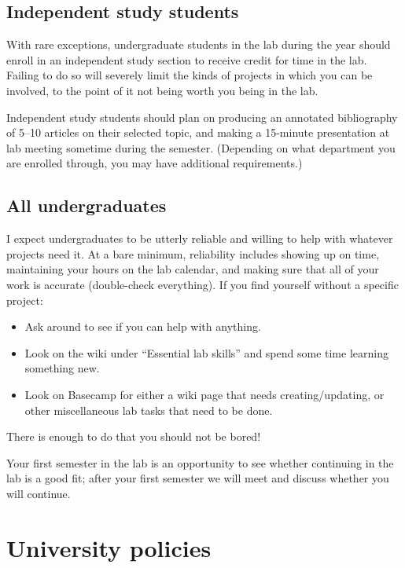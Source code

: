 \documentclass[letterpaper,12pt,oneside]{memoir}
\begin{document}
\subsection{Independent study students}
With rare exceptions, undergraduate students in the lab during the year should enroll in an independent study section to receive credit for time in the lab. Failing to do so will severely limit the kinds of projects in which you can be involved, to the point of it not being worth you being in the lab.

Independent study students should plan on producing an annotated bibliography of 5--10 articles on their selected topic, and making a 15-minute presentation at lab meeting sometime during the semester. (Depending on what department you are enrolled through, you may have additional requirements.)



\subsection{All undergraduates}

I expect undergraduates to be utterly reliable and willing to help with whatever projects need it. At a bare minimum, reliability includes showing up on time, maintaining your hours on the lab calendar, and making sure that all of your work is accurate (double-check everything). If you find yourself without a specific project:

\begin{itemize}
\item Ask around to see if you can help with anything.
\item Look on the wiki under ``Essential lab skills'' and spend some time learning something new.
\item Look on Basecamp for either a wiki page that needs creating/updating, or other miscellaneous lab tasks that need to be done.
\end{itemize}

There is enough to do that you should not be bored!

Your first semester in the lab is an opportunity to see whether continuing in the lab is a good fit; after your first semester we will meet and discuss whether you will continue.

\section{University policies}
\end{document}
